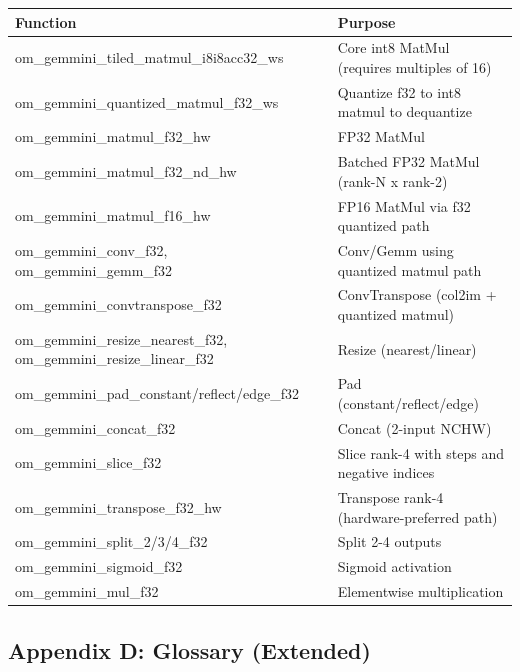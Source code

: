 \documentclass[12pt,a4paper]{article}
\begin{document}
\begin{longtable}{|p{}|p{}|}
\hline
\textbf{Function} & \textbf{Purpose} \\
\hline
om\_gemmini\_tiled\_matmul\_i8i8acc32\_ws & Core int8 MatMul (requires multiples of 16) \\
\hline
om\_gemmini\_quantized\_matmul\_f32\_ws & Quantize f32 to int8 matmul to dequantize \\
\hline
om\_gemmini\_matmul\_f32\_hw & FP32 MatMul \\
\hline
om\_gemmini\_matmul\_f32\_nd\_hw & Batched FP32 MatMul (rank-N x rank-2) \\
\hline
om\_gemmini\_matmul\_f16\_hw & FP16 MatMul via f32 quantized path \\
\hline
om\_gemmini\_conv\_f32, om\_gemmini\_gemm\_f32 & Conv/Gemm using quantized matmul path \\
\hline
om\_gemmini\_convtranspose\_f32 & ConvTranspose (col2im + quantized matmul) \\
\hline
om\_gemmini\_resize\_nearest\_f32, om\_gemmini\_resize\_linear\_f32 & Resize (nearest/linear) \\
\hline
om\_gemmini\_pad\_constant/reflect/edge\_f32 & Pad (constant/reflect/edge) \\
\hline
om\_gemmini\_concat\_f32 & Concat (2-input NCHW) \\
\hline
om\_gemmini\_slice\_f32 & Slice rank-4 with steps and negative indices \\
\hline
om\_gemmini\_transpose\_f32\_hw & Transpose rank-4 (hardware-preferred path) \\
\hline
om\_gemmini\_split\_2/3/4\_f32 & Split 2-4 outputs \\
\hline
om\_gemmini\_sigmoid\_f32 & Sigmoid activation \\
\hline
om\_gemmini\_mul\_f32 & Elementwise multiplication \\
\hline
\end{longtable}

\subsection{Appendix D: Glossary (Extended)}
\end{document}
